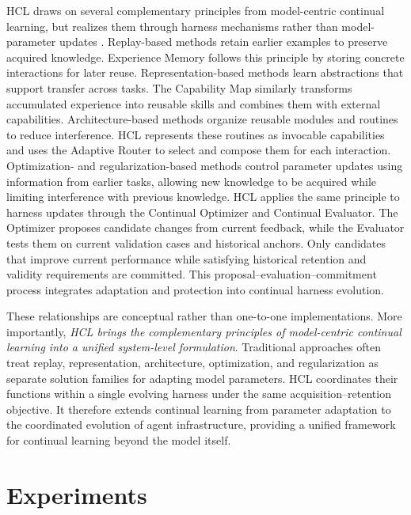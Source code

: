 \documentclass{article}
\begin{document}
HCL draws on several complementary principles from model-centric continual learning,
but realizes them through harness mechanisms rather than model-parameter
updates \citep{delange2021continual,wang2024comprehensive}. Replay-based methods
retain earlier examples to preserve acquired knowledge. Experience Memory
follows this principle by storing concrete interactions for later reuse.
Representation-based methods learn abstractions that support transfer across
tasks. The Capability Map similarly transforms accumulated experience into
reusable skills and combines them with external capabilities. Architecture-based
methods organize reusable modules and routines to reduce interference. HCL
represents these routines as invocable capabilities and uses the Adaptive
Router to select and compose them for each interaction. Optimization- and regularization-based
methods control parameter updates using information from
earlier tasks, allowing new knowledge to be acquired while limiting interference
with previous knowledge. 
HCL applies the same principle to harness updates
through the Continual Optimizer and Continual Evaluator. 
The Optimizer proposes
candidate changes from current feedback, while the Evaluator tests them on
current validation cases and historical anchors. 
Only candidates that improve
current performance while satisfying historical retention and validity
requirements are committed.
This proposal--evaluation--commitment process integrates adaptation and protection into continual harness evolution.

These relationships are conceptual rather than one-to-one implementations.
More importantly, \textit{HCL brings the complementary principles of model-centric
continual learning into a unified system-level formulation}. Traditional
approaches \citep{kang2025dynamic,liu2026branch} often treat replay, representation, architecture, optimization, and
regularization as separate solution families for adapting model parameters.
HCL coordinates their functions within a single evolving harness under the
same acquisition--retention objective. It therefore extends continual learning
from parameter adaptation to the coordinated evolution of agent
infrastructure, providing a unified framework for continual learning beyond
the model itself.
\section{Experiments}
\label{sec:experiments}
\end{document}
